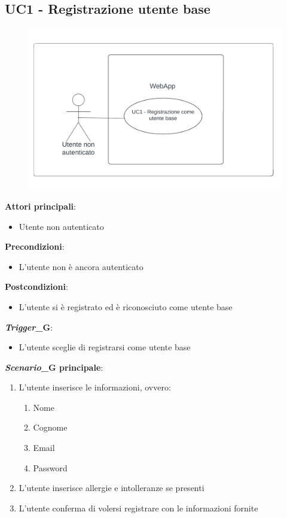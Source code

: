\subsection{UC1 - Registrazione utente base}\label{usecase:1}
\begin{figure}[H]
  \centering
  \includegraphics[width=\textwidth]{ucd/UCD1_corretto.png}
\end{figure}
\textbf{Attori principali}: 
\begin{itemize}
    \item Utente non autenticato
\end{itemize}
\textbf{Precondizioni}:
\begin{itemize}
    \item L'utente non è ancora autenticato
\end{itemize}
\textbf{Postcondizioni}: 
\begin{itemize}
    \item L'utente si è registrato ed è riconosciuto come utente base 
\end{itemize}
\textbf{\textit{Trigger}_G}:
\begin{itemize}
    \item L'utente sceglie di registrarsi come utente base
\end{itemize}
\textbf{\textit{Scenario}_G principale}:
\begin{enumerate}
    \item L'utente inserisce le informazioni, ovvero:
    \begin{enumerate}
        \item Nome
        \item Cognome
        \item Email
        \item Password
    \end{enumerate}
    \item L'utente inserisce allergie e intolleranze se presenti
    \item L'utente conferma di volersi registrare con le informazioni fornite
\end{enumerate}
